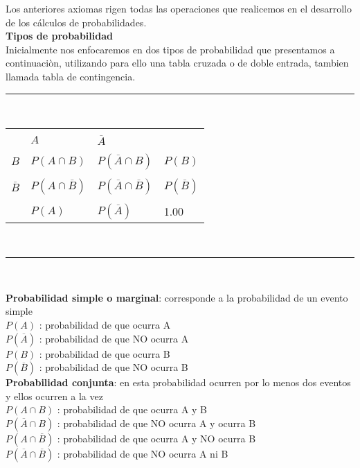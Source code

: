 \documentclass[base=hide,12pt]{elegantbook}
\begin{document}
Los anteriores axiomas rigen todas las operaciones que realicemos en  el desarrollo de los cálculos de probabilidades.\\

\newpage 
\textcolor{col4}{\large  \bf Tipos de probabilidad}\\

Inicialmente nos enfocaremos en  dos tipos de probabilidad que presentamos a continuaciòn, utilizando para ello una tabla cruzada o de doble entrada, tambien llamada tabla de contingencia. 
\begin{center}
		\rule{9cm}{.1cm}\\
{\small 
	\begin{tabular}{p{1.5cm}|p{2cm}|p{2cm}|p{1.5cm}}
		&&\\
		&  $A$  & $\overline{A}$ & \\
		\hline
		&&\\
		$B$   &$P(A \cap B)$ &  $P(\overline{A} \cap B)$&$P(B)$\\
		\hline
		&&\\
		$\overline{B}$   &$P(A \cap \overline{B})$ &  $P(\overline{A} \cap\overline{B})$&$P(\overline{B})$\\
		\hline
		&&\\ 
		& $P(A)$ & $P(\overline{A})$ & 1.00 \\
	\end{tabular}
	\\
}
\rule{9cm}{.1cm}\\
\end{center}

\textcolor{col4}{\bf Probabilidad simple o marginal}: corresponde a la probabilidad de un  evento simple \\
$P(A)$ : probabilidad de que ocurra A \\
$P(\overline{A})$ : probabilidad de que NO ocurra A \\
$P(B)$ : probabilidad de que ocurra B \\
$P(\overline{B})$ : probabilidad de que NO ocurra B \\

\textcolor{col4}{\bf Probabilidad conjunta}: en esta probabilidad ocurren por lo menos dos eventos y ellos  ocurren a la  vez \\ 
$P(A \cap B)$ : probabilidad de que ocurra A y B \\
$P(\overline{A} \cap B)$ : probabilidad de que NO ocurra A y ocurra B \\
$P(A \cap \overline{B})$ : probabilidad de que ocurra A y NO ocurra B \\
$P(\overline{A} \cap \overline{B})$ : probabilidad de que NO ocurra A ni B \\

\end{document}
